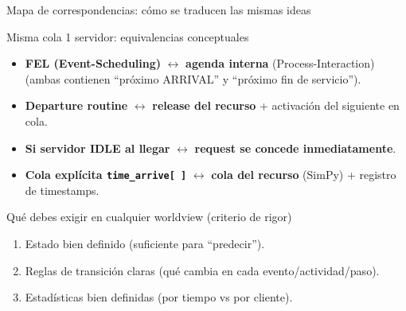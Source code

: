 \documentclass[aspectratio=1610, 9pt]{beamer}
\begin{document}
\begin{frame}{Mapa de correspondencias: cómo se traducen las mismas ideas}
\small
\begin{block}{Misma cola 1 servidor: equivalencias conceptuales}
\begin{itemize}
\item \textbf{FEL (Event-Scheduling)} $\leftrightarrow$ \textbf{agenda interna} (Process-Interaction)  
\hspace{3mm} (ambas contienen “próximo ARRIVAL” y “próximo fin de servicio”).
\item \textbf{Departure routine} $\leftrightarrow$ \textbf{release del recurso} + activación del siguiente en cola.
\item \textbf{Si servidor IDLE al llegar} $\leftrightarrow$ \textbf{request se concede inmediatamente}.
\item \textbf{Cola explícita \texttt{time\_arrive[ ]}} $\leftrightarrow$ \textbf{cola del recurso} (SimPy) + registro de timestamps.
\end{itemize}
\end{block}

\vspace{4pt}
\begin{block}{Qué debes exigir en cualquier worldview (criterio de rigor)}
\begin{enumerate}
\item Estado bien definido (suficiente para “predecir”).
\item Reglas de transición claras (qué cambia en cada evento/actividad/paso).
\item Estadísticas bien definidas (por tiempo vs por cliente).
\end{enumerate}
\end{block}
\end{frame}
\end{document}
